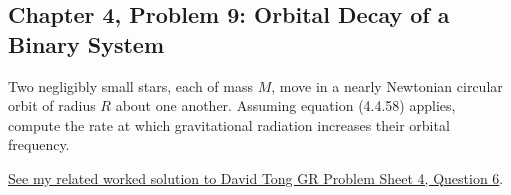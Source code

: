 \subsection{Chapter 4, Problem 9: Orbital Decay of a Binary System}

Two negligibly small stars, each of mass $M$, move in a nearly Newtonian circular
orbit of radius $R$ about one another. Assuming equation (4.4.58) applies, compute
the rate at which gravitational radiation increases their orbital frequency.
\begin{solution}
\href{https://luca-yucheng-jin.github.io/luca-physics-site/notes/tong-gr-ps4.html#gravitational-wave-emission-from-a-binary-system-q6}{See my related worked solution to David Tong GR Problem Sheet 4, Question 6}.
\end{solution}
